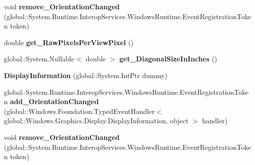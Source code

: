 \begin{DoxyCompactItemize}
\item 
\mbox{\label{class_windows_1_1_graphics_1_1_display_1_1_display_information_a56bbdaab1ef2d9feb7c4b16d8d9f3a3a}} 
void {\bfseries remove\+\_\+\+Orientation\+Changed} (global\+::\+System.\+Runtime.\+Interop\+Services.\+Windows\+Runtime.\+Event\+Registration\+Token token)
\item 
\mbox{\label{class_windows_1_1_graphics_1_1_display_1_1_display_information_a9dc97c2bae189efb6b8e34a738397257}} 
double {\bfseries get\+\_\+\+Raw\+Pixels\+Per\+View\+Pixel} ()
\item 
\mbox{\label{class_windows_1_1_graphics_1_1_display_1_1_display_information_acf94f914fc79e6744c2000d54965e060}} 
global\+::\+System.\+Nullable$<$ double $>$ {\bfseries get\+\_\+\+Diagonal\+Size\+In\+Inches} ()
\item 
\mbox{\label{class_windows_1_1_graphics_1_1_display_1_1_display_information_a0cf7eebf1d214c165095e5dcf34c9b50}} 
{\bfseries Display\+Information} (global\+::\+System.\+Int\+Ptr dummy)
\item 
\mbox{\label{class_windows_1_1_graphics_1_1_display_1_1_display_information_ab25de6d82f535e3e82722b7b34a2e485}} 
global\+::\+System.\+Runtime.\+Interop\+Services.\+Windows\+Runtime.\+Event\+Registration\+Token {\bfseries add\+\_\+\+Orientation\+Changed} (global\+::\+Windows.\+Foundation.\+Typed\+Event\+Handler$<$ global\+::\+Windows.\+Graphics.\+Display.\+Display\+Information, object $>$ handler)
\item 
\mbox{\label{class_windows_1_1_graphics_1_1_display_1_1_display_information_a56bbdaab1ef2d9feb7c4b16d8d9f3a3a}} 
void {\bfseries remove\+\_\+\+Orientation\+Changed} (global\+::\+System.\+Runtime.\+Interop\+Services.\+Windows\+Runtime.\+Event\+Registration\+Token token)
\item 
\mbox{\label{class_windows_1_1_graphics_1_1_display_1_1_display_information_a9dc97c2bae189efb6b8e34a738397257}} 

\end{DoxyCompactItemize}
